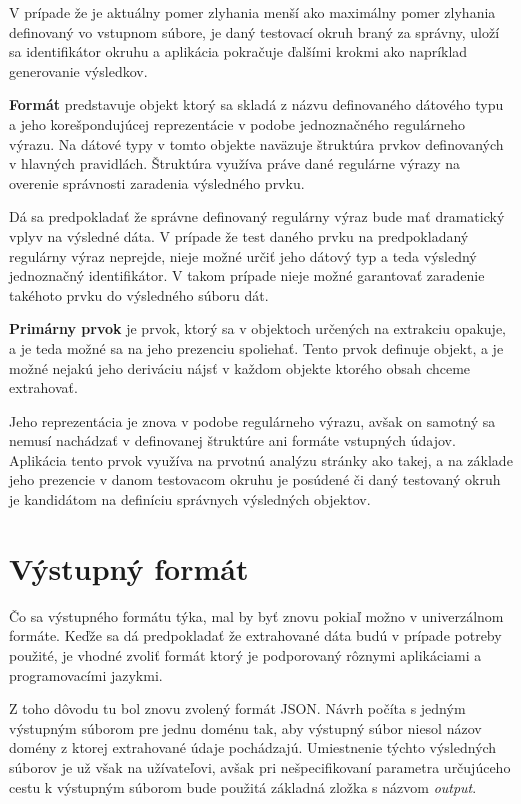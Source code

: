 V prípade že je aktuálny pomer zlyhania menší ako maximálny pomer zlyhania definovaný vo vstupnom súbore, je daný testovací okruh braný za správny, uloží sa identifikátor okruhu a aplikácia pokračuje ďalšími krokmi ako napríklad generovanie výsledkov.

\bigskip

\textbf{Formát} predstavuje objekt ktorý sa skladá z názvu definovaného dátového typu a jeho korešpondujúcej reprezentácie v podobe jednoznačného regulárneho výrazu. Na dátové typy v tomto objekte naväzuje štruktúra prvkov definovaných v hlavných pravidlách. Štruktúra využíva práve dané regulárne výrazy na overenie správnosti zaradenia výsledného prvku.

Dá sa predpokladať že správne definovaný regulárny výraz bude mať dramatický vplyv na výsledné dáta. V prípade že test daného prvku na predpokladaný regulárny výraz neprejde, nieje možné určiť jeho dátový typ a teda výsledný jednoznačný identifikátor. V takom prípade nieje možné garantovať zaradenie takéhoto prvku do výsledného súboru dát.

\newpage

\textbf{Primárny prvok} je prvok, ktorý sa v objektoch určených na extrakciu opakuje, a je teda možné sa na jeho prezenciu spoliehať. Tento prvok definuje objekt, a je možné nejakú jeho deriváciu nájsť v každom objekte ktorého obsah chceme extrahovať. 

Jeho reprezentácia je znova v podobe regulárneho výrazu, avšak on samotný sa nemusí nachádzať v definovanej štruktúre ani formáte vstupných údajov. Aplikácia tento prvok využíva na prvotnú analýzu stránky ako takej, a na základe jeho prezencie v danom testovacom okruhu je posúdené či daný testovaný okruh je kandidátom na definíciu správnych výsledných objektov.


\section{Výstupný formát}

Čo sa výstupného formátu týka, mal by byť znovu pokiaľ možno v univerzálnom formáte. Keďže sa dá predpokladať že extrahované dáta budú v prípade potreby použité, je vhodné zvoliť formát ktorý je podporovaný rôznymi aplikáciami a programovacími jazykmi.

Z toho dôvodu tu bol znovu zvolený formát JSON. Návrh počíta s jedným výstupným súborom pre jednu doménu tak, aby výstupný súbor niesol názov domény z ktorej extrahované údaje pochádzajú. Umiestnenie týchto výsledných súborov je už však na užívateľovi, avšak pri nešpecifikovaní parametra určujúceho cestu k výstupným súborom bude použitá základná zložka s názvom \textit{output}.

